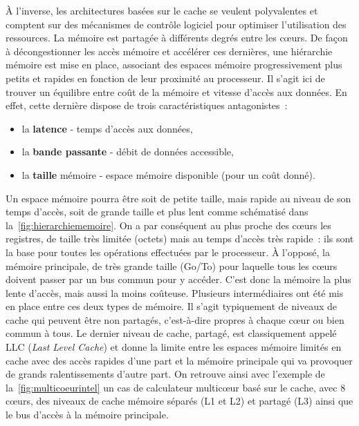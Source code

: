 \documentclass[french, a4paper, 11pt, twoside, pdftex]{StyleThese}
\begin{document}
		À l'inverse, les architectures basées sur le cache se veulent polyvalentes et comptent sur des mécanismes de contrôle logiciel pour optimiser l'utilisation des ressources.
		La mémoire est partagée à différents degrés entre les cœurs. De façon à décongestionner les accès mémoire et accélérer ces dernières, une hiérarchie mémoire est mise en place, associant des espaces mémoire progressivement plus petits et rapides en fonction de leur proximité au processeur. Il s'agit ici de trouver un équilibre entre coût de la mémoire et vitesse d'accès aux données. En effet,  cette dernière dispose de trois caractéristiques antagonistes~:
			\begin{itemize}
				\item la \textbf{latence} - temps d'accès aux données, 
				\item la \textbf{bande passante} - débit de données accessible,
				\item la \textbf{taille} mémoire - espace mémoire disponible (pour un coût donné).
			\end{itemize}
		Un espace mémoire pourra être soit de petite taille, mais rapide au niveau de son temps d'accès, soit de grande taille et plus lent comme schématisé dans la~\autoref{fig:hierarchiememoire}.  On a par conséquent au plus proche des cœurs les registres, de taille très limitée (octets) mais au temps d'accès très rapide~: ils sont la base pour toutes les opérations effectuées par le processeur. À l'opposé, la mémoire principale, de très grande taille (Go/To) pour laquelle tous les cœurs doivent passer par un bus commun pour y accéder. C'est donc la mémoire la plus lente d'accès, mais aussi la moins coûteuse. Plusieurs intermédiaires ont été mis en place entre ces deux types de mémoire. Il s'agit typiquement de niveaux de cache qui peuvent être non partagés, c'est-à-dire propres à chaque cœur ou bien commun à tous. Le dernier niveau de cache, partagé, est classiquement appelé LLC (\emph{Last Level Cache}) et donne la limite entre les espaces mémoire limités en cache avec des accès rapides d'une part et la mémoire principale qui va provoquer de grands ralentissements d'autre part. 			
		On retrouve ainsi avec l'exemple de la~\autoref{fig:multicoeurintel} un cas de calculateur multicœur basé sur le cache, avec 8 cœurs, des niveaux de cache mémoire séparés (L1 et L2) et partagé (L3) ainsi que le bus d'accès à la mémoire principale. 
		
\end{document}
